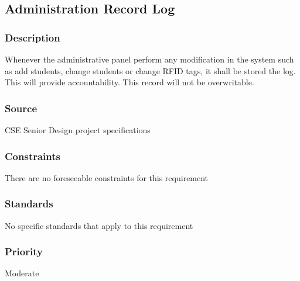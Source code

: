 \subsection{Administration Record Log}
\subsubsection{Description}
\quad \quad Whenever the administrative panel perform any modification in the system such as 
add students, change students or change RFID tags, it shall be stored the log. This 
will provide accountability. This record will not be overwritable.
\subsubsection{Source}
\quad \quad CSE Senior Design project specifications
\subsubsection{Constraints}
\quad \quad There are no foreseeable constraints for this requirement  
\subsubsection{Standards}
\quad \quad No specific standards that apply to this requirement
\subsubsection{Priority}
\quad \quad Moderate